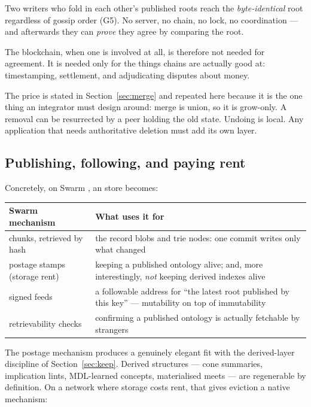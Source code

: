 \begin{keyidea}
Two writers who fold in each other's published roots reach the
\emph{byte-identical} root regardless of gossip order (G5). No server, no
chain, no lock, no coordination --- and afterwards they can \emph{prove} they
agree by comparing the root.

The blockchain, when one is involved at all, is therefore not needed for
agreement. It is needed only for the things chains are actually good at:
timestamping, settlement, and adjudicating disputes about money.
\end{keyidea}

The price is stated in Section~\ref{sec:merge} and repeated here because it is
the one thing an integrator must design around: merge is union, so it is
grow-only. A removal can be resurrected by a peer holding the old state.
Undoing is local. Any application that needs authoritative deletion must add
its own layer.

\subsection{Publishing, following, and paying rent}
\label{sec:crypto-economics}

Concretely, on Swarm \citep{tron2020}, an \odag{} store becomes:

\begin{center}\small
\begin{tabularx}{\textwidth}{@{}p{4.2cm} X@{}}
\toprule
\textbf{Swarm mechanism} & \textbf{What \odag{} uses it for}\\
\midrule
chunks, retrieved by hash & the record blobs and trie nodes: one commit
  writes only what changed\\
postage stamps (storage rent) & keeping a published ontology alive; and, more
  interestingly, \emph{not} keeping derived indexes alive\\
signed feeds & a followable address for ``the latest root published by this
  key'' --- mutability on top of immutability\\
retrievability checks & confirming a published ontology is actually fetchable
  by strangers\\
\bottomrule
\end{tabularx}
\end{center}

The postage mechanism produces a genuinely elegant fit with the derived-layer
discipline of Section~\ref{sec:keep}. Derived structures --- cone summaries,
implication lints, MDL-learned concepts, materialised meets --- are
regenerable by definition. On a network where storage costs rent, that gives
eviction a native mechanism:

